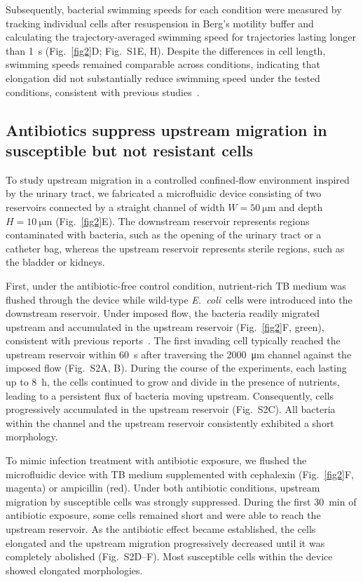 \documentclass[twoside,twocolumn,9pt]{article}
\newcommand{\ecoli}{{\it E.~coli}}
\begin{document}
    Subsequently, bacterial swimming speeds for each condition were measured by tracking individual cells after resuspension in Berg's motility buffer and calculating the trajectory-averaged swimming speed for trajectories lasting longer than \SI{1}{\second} (Fig.~\ref{fig2}D; Fig.~S1E, H). Despite the differences in cell length, swimming speeds remained comparable across conditions, indicating that elongation did not substantially reduce swimming speed under the tested conditions, consistent with previous studies~\cite{Kamdar2023-eb,Maki2000-kp}.
    
    \subsection*{Antibiotics suppress upstream migration in susceptible but not resistant cells}
    
    To study upstream migration in a controlled confined-flow environment inspired by the urinary tract, we fabricated a microfluidic device consisting of two reservoirs connected by a straight channel of width $W=\SI{50}{\micro\metre}$ and depth $H=\SI{10}{\micro\metre}$ (Fig.~\ref{fig2}E). The downstream reservoir represents regions contaminated with bacteria, such as the opening of the urinary tract or a catheter bag, whereas the upstream reservoir represents sterile regions, such as the bladder or kidneys. 
    
    First, under the antibiotic-free control condition, nutrient-rich TB medium was flushed through the device while wild-type \ecoli\ cells were introduced into the downstream reservoir. Under imposed flow, the bacteria readily migrated upstream and accumulated in the upstream reservoir (Fig.~\ref{fig2}F, green), consistent with previous reports~\cite{Figueroa-Morales2015-fx,Tao2026-yc}. The first invading cell typically reached the upstream reservoir within \SI{60}{\second} after traversing the \SI{2000}{\micro\metre} channel against the imposed flow (Fig.~S2A, B).
    During the course of the experiments, each lasting up to \SI{8}{\hour}, the cells continued to grow and divide in the presence of nutrients, leading to a persistent flux of bacteria moving upstream. 
    Consequently, cells progressively accumulated in the upstream reservoir (Fig.~S2C).
    All bacteria within the channel and the upstream reservoir consistently exhibited a short morphology.
    
    To mimic infection treatment with antibiotic exposure, we flushed the microfluidic device with TB medium supplemented with cephalexin (Fig.~\ref{fig2}F, magenta) or ampicillin (red). Under both antibiotic conditions, upstream migration by susceptible cells was strongly suppressed. During the first \SI{30}{\minute} of antibiotic exposure, some cells remained short and were able to reach the upstream reservoir. As the antibiotic effect became established, the cells elongated and the upstream migration progressively decreased until it was completely abolished (Fig.~S2D--F). Most susceptible cells within the device showed elongated morphologies.
    
\end{document}
